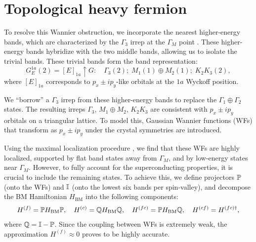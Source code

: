 



\chapter{Topological heavy fermion} \label{ch:topoheavyfermion}


To resolve this Wannier obstruction, we incorporate the nearest higher-energy bands, which are characterized by the \(\Gamma_3\) irrep at the \(\Gamma_M\) point \cite{topoheavyfermion2022}. These higher-energy bands hybridize with the two middle bands, allowing us to isolate the trivial bands. These trivial bands form the band representation:
\begin{equation} \label{eq:trivial-irreps}
G_E^{1a}(2) = [E]_{1a} \uparrow G: \quad \Gamma_3(2); \; M_1(1) \oplus M_2(1); \; K_2 K_3(2),
\end{equation}
where \([E]_{1a}\) corresponds to \(p_x \pm i p_y\)-like orbitals at the \(1a\) Wyckoff position.

We ``borrow'' a $\Gamma_3$ irrep from these higher-energy bands to replace the $\Gamma_1 \oplus \Gamma_2$ states. The resulting irreps $\Gamma_3$, $M_1 \oplus M_2$, $K_2 K_3$ are consistent with $p_x \pm i p_y$ orbitals on a triangular lattice. To model this, Gaussian Wannier functions (WFs) that transform as $p_x \pm i p_y$ under the crystal symmetries are introduced.

Using the maximal localization procedure \cite{maxlocalWFs_marzari2012, wannier90}, we find that these WFs are highly localized, supported by flat band states away from $\Gamma_M$, and by low-energy states near $\Gamma_M$. However, to fully account for the superconducting properties, it is crucial to include the remaining states. To achieve this, we define projectors ${\mathbb{P}}$ (onto the WFs) and ${\mathbb{I}}$ (onto the lowest six bands per spin-valley), and decompose the BM Hamiltonian $H_\text{BM}$ into the following components:
\begin{equation} \label{eq:projected_hamiltonians_WFs_PQ}
H^{(f)} = {\mathbb{P}} H_\text{BM} {\mathbb{P}}, \quad H^{(c)} = {\mathbb{Q}} H_\text{BM} {\mathbb{Q}}, \quad H^{(fc)} = {\mathbb{P}} H_\text{BM} {\mathbb{Q}}, \quad H^{(cf)} = H^{(fc)\dagger},
\end{equation}
where ${\mathbb{Q}} = {\mathbb{I}} - {\mathbb{P}}$. Since the coupling between WFs is extremely weak, the approximation $H^{(f)} \approx 0$ proves to be highly accurate.

